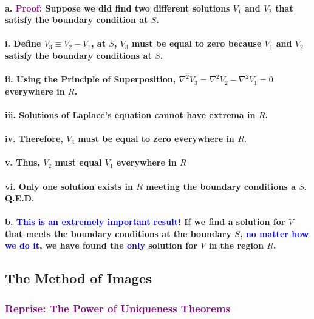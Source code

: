 \documentclass{article}
\begin{document}
\paragraph{\indent a. \textcolor{purple}{Proof:} Suppose we did find two different solutions $V_1$ and $V_2$ that satisfy the boundary condition at $S$.}
\paragraph{\indent\indent i. Define $V_3\equiv V_2-V_1$, at $S$, $V_3$ must be equal to zero because $V_1$ and $V_2$ satisfy the boundary conditions at $S$.}
\paragraph{\indent\indent ii. Using the Principle of Superposition, $\nabla^2 V_3=\nabla^2V_2-\nabla^2V_1=0$ everywhere in $R$.}
\paragraph{\indent\indent iii. Solutions of Laplace's equation cannot have extrema in $R$.}
\paragraph{\indent\indent iv. Therefore, $V_3$ must be equal to zero everywhere in $R$.}
\paragraph{\indent\indent v. Thus, $V_2$  must equal $V_1$ everywhere in $R$}
\paragraph{\indent\indent vi. Only one solution exists in $R$ meeting the boundary conditions a $S$. Q.E.D.}
\paragraph{\indent b. \textcolor{blue}{This is an extremely important result!} If we find a solution for $V$ that meets the boundary conditions at the boundary $S$, \textcolor{blue}{no matter how we do it}, we have found the \textcolor{blue}{only} solution for $V$ in the region $R$.}
\subsection{The Method of Images}
\subsubsection{\textcolor{purple}{Reprise: The Power of Uniqueness Theorems}}
\end{document}
